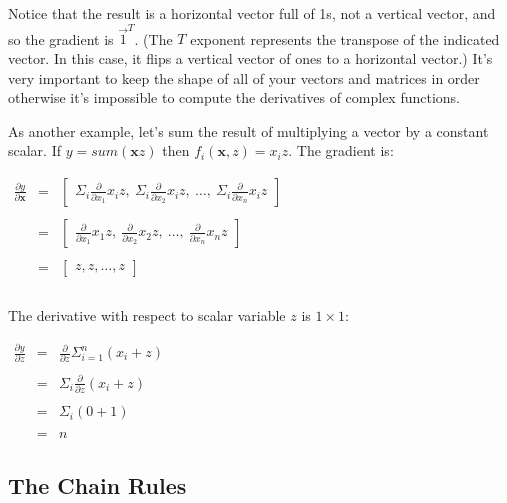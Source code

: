 \documentclass[11pt]{article}
\begin{document}
Notice that the result is a horizontal vector full of 1s, not a vertical vector, and so the gradient is $\vec{1}^T$. (The $T$ exponent represents the transpose of the indicated vector. In this case, it flips a vertical vector of ones to a horizontal vector.) It's very important to keep the shape of all of your vectors and matrices in order otherwise it's impossible to compute the derivatives of complex functions.

As another example, let's sum the result of multiplying a vector by a constant scalar.  If $y = sum(\mathbf{x} z)$ then $f_i(\mathbf{x},z) = x_i z$. The gradient is:

$
\begin{array}{lcl}
\frac{\partial y}{\partial \mathbf{x}} & = & \begin{bmatrix} \Sigma_i \frac{\partial}{\partial x_1} x_i z,~ \Sigma_i \frac{\partial }{\partial x_2} x_i z,~ \ldots,~ \Sigma_i \frac{\partial}{\partial x_n} x_i z  \end{bmatrix}\\\\
 & = & \begin{bmatrix} \frac{\partial}{\partial x_1} x_1 z,~ \frac{\partial }{\partial x_2} x_2 z,~ \ldots,~ \frac{\partial}{\partial x_n} x_n z  \end{bmatrix}\\\\
 & = & \begin{bmatrix} z, z, \ldots, z \end{bmatrix}\\\\
\end{array}
$

The derivative with respect to scalar variable $z$ is $1 \times 1$:

$
\begin{array}{lcl}
\frac{\partial y}{\partial z} & = & \frac{\partial}{\partial z} \Sigma_{i=1}^n (x_i+z)\\\\
& = & \Sigma_i \frac{\partial}{\partial z} (x_i+z)\\\\
& = & \Sigma_i (0 + 1)\\\\
& = & n
\end{array}
$

\subsection{The Chain Rules}
\end{document}
